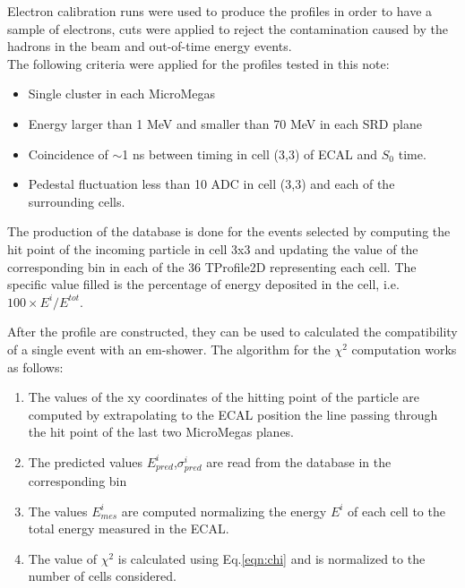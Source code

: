 Electron calibration runs were used to produce the profiles in order to have a sample of electrons, cuts were applied to reject the contamination caused by the hadrons in the beam and out-of-time energy events. \\
The following criteria were applied for the profiles tested in this
note:

\begin{itemize}
\item Single cluster in each MicroMegas
\item Energy larger than 1 MeV and smaller than 70 MeV in each SRD
  plane
\item Coincidence of $\sim$1 ns between timing in cell (3,3) of ECAL
  and $S_0$ time.
\item Pedestal fluctuation less than 10 ADC in cell (3,3) and each of
  the surrounding cells.
\end{itemize}

The production of the database is done for the events
selected by computing the hit point of the incoming particle in cell
3x3 and updating the value of the corresponding bin in each of the 36
TProfile2D representing each cell. The specific value filled is the
percentage of energy deposited in the cell, i.e. $100 \times E^i/E^{tot}$.

After the profile are constructed, they can be used to calculated the compatibility of a single event with an em-shower. The algorithm for the $\chi^2$ computation works as follows:
\begin{enumerate}
\item The values of the xy coordinates of the hitting point of the
  particle are computed by extrapolating to the ECAL position the line
  passing through the hit point of the last two MicroMegas planes.
\item The predicted values $E_{pred}^i$,$\sigma^{i}_{pred}$ are read from the database in the corresponding bin
\item The values $E_{mes}^i$ are computed normalizing the energy $E^i$ of each cell to the total energy measured in the ECAL.
\item The value of $\chi^2$ is calculated using Eq.\ref{eqn:chi} and is normalized to the number of cells considered.
\end{enumerate}

